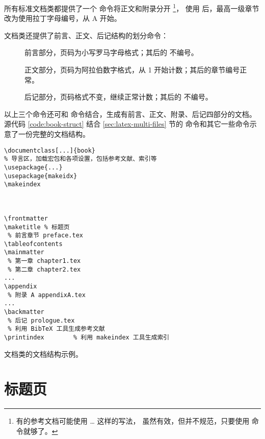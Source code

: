 所有标准文档类都提供了一个  命令将正文和附录分开%
\footnote{有的参考文档可能使用   \ldots {}  这样的写法，
虽然有效，但并不规范，只要使用  命令就够了。}，
使用  后，最高一级章节改为使用拉丁字母编号，从 A 开始。

 文档类还提供了前言、正文、后记结构的划分命令：
\begin{description}
  \item[] 前言部分，页码为小写罗马字母格式；其后的  不编号。
  \item[] 正文部分，页码为阿拉伯数字格式，从 1 开始计数；其后的章节编号正常。
  \item[] 后记部分，页码格式不变，继续正常计数；其后的  不编号。
\end{description}

以上三个命令还可和  命令结合，生成有前言、正文、附录、后记四部分的文档。
源代码 \ref{code:book-struct} 结合 \ref{sec:latex-multi-files} 节的  命令和其它一些命令示意了一份完整的文档结构。

\begin{sourcecode}[htp]
\begin{Verbatim}
\documentclass[...]{book}
% 导言区，加载宏包和各项设置，包括参考文献、索引等
\usepackage{...}
\usepackage{makeidx}
\makeindex



\frontmatter
\maketitle % 标题页
 % 前言章节 preface.tex
\tableofcontents
\mainmatter
 % 第一章 chapter1.tex
 % 第二章 chapter2.tex
...
\appendix
 % 附录 A appendixA.tex
...
\backmatter
 % 后记 prologue.tex
 % 利用 BibTeX 工具生成参考文献
\printindex        % 利用 makeindex 工具生成索引

\end{Verbatim}
\caption{ 文档类的文档结构示例。}\label{code:book-struct}
\end{sourcecode}

\section{标题页}\label{sec:titlepage}


